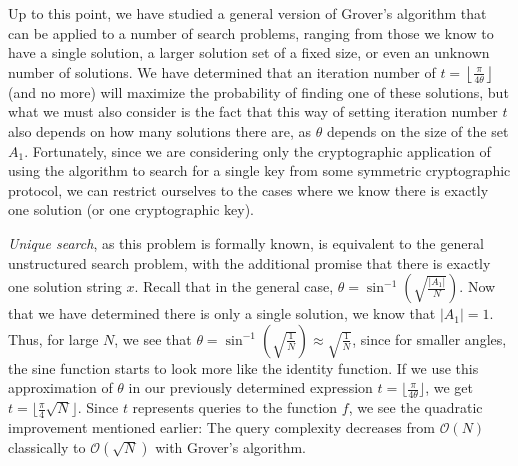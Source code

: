 Up to this point, we have studied a general version of Grover's algorithm that can be applied to a number of search problems, ranging from those we know to have a single solution, a larger solution set of a fixed size, or even an unknown number of solutions. We have determined that an iteration number of $t = \left \lfloor \frac{\pi}{4\theta} \right \rfloor$ (and no more) will maximize the probability of finding one of these solutions, but what we must also consider is the fact that this way of setting iteration number $t$ also depends on how many solutions there are, as $\theta$ depends on the size of the set $A_1$. Fortunately, since we are considering only the cryptographic application of using the algorithm to search for a single key from some symmetric cryptographic protocol, we can restrict ourselves to the cases where we know there is exactly one solution (or one cryptographic key).

\emph{Unique search}, as this problem is formally known, is equivalent to the general unstructured search problem, with the additional promise that there is exactly one solution string $x$. Recall that in the general case, $\theta = \sin ^{-1} \left (\sqrt{\frac{|A_1|}{N}} \right )$. Now that we have determined there is only a single solution, we know that $|A_1| = 1$. Thus, for large $N$, we see that $\theta = \sin ^{-1} \left (\sqrt{\frac{1}{N}} \right ) \approx \sqrt{\frac{1}{N}}$, since for smaller angles, the sine function starts to look more like the identity function. %
If we use this approximation of $\theta$ in our previously determined expression $t = \lfloor \frac{\pi}{4\theta} \rfloor$, we get $t = \lfloor \frac{\pi}{4}\sqrt{N} \rfloor$. Since $t$ represents queries to the function $f$, we see the quadratic improvement mentioned earlier: The query complexity decreases from $\mathcal{O}(N)$ classically to $\mathcal{O}(\sqrt{N})$ with Grover's algorithm. 

